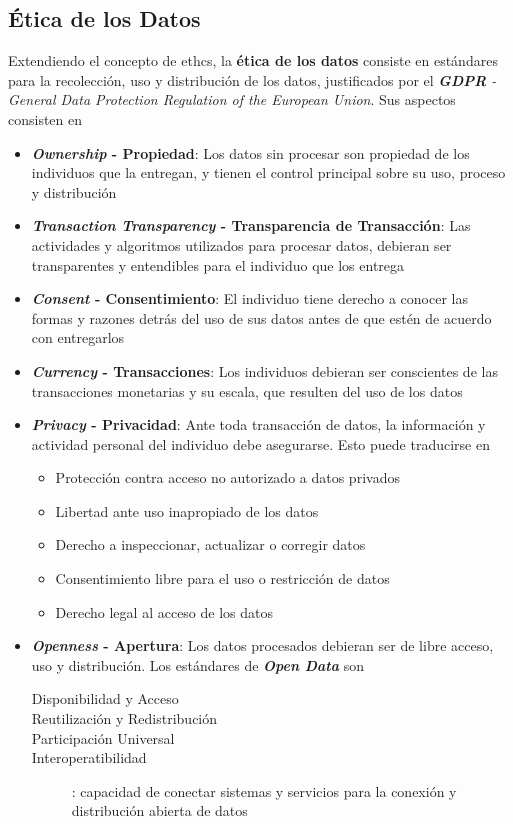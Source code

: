 \subsection{Ética de los Datos}
Extendiendo el concepto de \gls{ethcs}, la \textbf{ética de los datos} consiste en estándares para la recolección, uso y distribución de los datos, justificados por el \textit{\textbf{GDPR} - General Data Protection Regulation of the European Union}. Sus aspectos consisten en
\begin{itemize}
    \item {\textbf{\textit{Ownership} - Propiedad}: Los datos sin procesar son propiedad de los individuos que la entregan, y tienen el control principal sobre su uso, proceso y distribución}
    \item {\textbf{\textit{Transaction Transparency} - Transparencia de Transacción}: Las actividades y algoritmos utilizados para procesar datos, debieran ser transparentes y entendibles para el individuo que los entrega}
    \item {\textbf{\textit{Consent} - Consentimiento}: El individuo tiene derecho a conocer las formas y razones detrás del uso de sus datos antes de que estén de acuerdo con entregarlos}
    \item {\textbf{\textit{Currency} - Transacciones}: Los individuos debieran ser conscientes de las transacciones monetarias y su escala, que resulten del uso de los datos}
    \item {\textbf{\textit{Privacy} - Privacidad}: Ante toda transacción de datos, la información y actividad personal del individuo debe asegurarse. Esto puede traducirse en
    \begin{itemize}
        \item {Protección contra acceso no autorizado a datos privados}
        \item {Libertad ante uso inapropiado de los datos}
        \item {Derecho a inspeccionar, actualizar o corregir datos}
        \item {Consentimiento libre para el uso o restricción de datos}
        \item {Derecho legal al acceso de los datos}
    \end{itemize}}
    \item {\textbf{\textit{Openness} - Apertura}: Los datos procesados debieran ser de libre acceso, uso y distribución. Los estándares de \textbf{\textit{Open Data}} son
    \begin{description}
        \item [Disponibilidad y Acceso]
        \item [Reutilización y Redistribución]
        \item [Participación Universal]
        \item [Interoperatibilidad]{: capacidad de conectar sistemas y servicios para la conexión y distribución abierta de datos}
    \end{description}}
\end{itemize}

